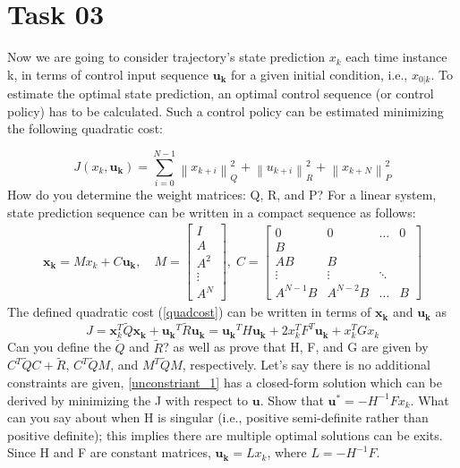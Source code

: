 \documentclass[12pt]{article}%
\begin{document}
\section{Task 03}
Now we are going to consider trajectory's state prediction $x_k$ each time instance k, in terms of control input sequence $\mathbf{u_k}$ for a given initial condition, i.e., $x_{0|k}$. To estimate the optimal state prediction, an optimal control sequence (or control policy) has to be calculated. Such a control policy can be estimated minimizing the following quadratic cost:

\begin{equation}\label{quadcost}
    J(x_k, \mathbf{u_k}) = \sum_{i=0}^{N-1} \left \| x_{k+i} \right \|_Q^2 + \left \| u_{k+i} \right \|_R^2 + \left \| x_{k+N} \right \|_P^2 
\end{equation} How do you determine the weight matrices: Q, R, and P?
For a linear system, state prediction sequence can be written in a compact sequence as follows:
\begin{equation}
\begin{aligned}
    \mathbf{x_k} = Mx_k + C\mathbf{u_k}, \quad 
    M = \begin{bmatrix}
I\\ 
A\\ 
A^2\\ 
\vdots \\ 
A^N
\end{bmatrix} , \; C = \begin{bmatrix}
0 & 0 & \hdots & 0\\ 
B &  &  & \\ 
AB & B &  & \\ 
 \vdots & \vdots & \ddots & \\ 
A^{N-1}B & A^{N-2}B & \hdots & B 
\end{bmatrix}
\end{aligned}
\end{equation} The defined quadratic cost (\ref{quadcost}) can be written in terms of $\mathbf{x_k}$ and $\mathbf{u_k}$ as 
\begin{equation}\label{unconstriant_1}
    J = \mathbf{x}_k^T\tilde{Q}\mathbf{x_k} + \mathbf{u_k}^T\tilde{R}\mathbf{u_k} = \mathbf{u_k}^TH\mathbf{u_k} + 2x_k^TF^T\mathbf{u_k}+x_k^TGx_k
\end{equation} Can you define the $\tilde{Q}$ and $\tilde{R}$? as well as prove that H, F, and G are given by $C^T\tilde{Q}C + \tilde{R}$, $C^T\tilde{Q}M$, and $M^T\tilde{Q}M$, respectively. Let's say there is no additional constraints are given, \ref{unconstriant_1} has a closed-form solution which can be derived by minimizing the J with respect to $\mathbf{u}$.   Show that $\mathbf{u}^* = -H^{-1}Fx_k$. What can you say about when H is singular (i.e., positive semi-definite rather than positive definite); this implies there are multiple optimal solutions can be exits. Since H and F are constant matrices, $\mathbf{u_k} = Lx_k$, where $L = -H^{-1}F$. 
\end{document}
